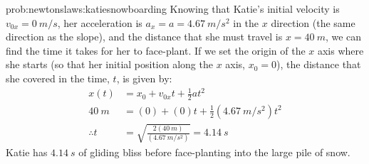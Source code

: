 \begin{solution}{prob:newtonslaws:katiesnowboarding}
Knowing that Katie's initial velocity is $v_{0x}=\SI{0}{m/s}$, her acceleration is $a_x=a=\SI{4.67}{m/s^2}$ in the $x$ direction (the same direction as the slope), and the distance that she must travel is $x=\SI{40}{m}$, we can find the time it takes for her to face-plant. If we set the origin of the $x$ axis where she starts (so that her initial position along the $x$ axis, $x_0=0$), the distance that she covered in the time, $t$, is given by:
\begin{align*}
x(t)&=x_0+v_{0x}t+\frac{1}{2}at^2\\
\SI{40}{m}&=(0)+(0)t+\frac{1}{2}(\SI{4.67}{m/s^2})t^2\\
\therefore t&=\sqrt{\frac{2(\SI{40}{m})}{(\SI{4.67}{m/s^2})}}=\SI{4.14}{s}
\end{align*}
Katie has $\SI{4.14}{s}$ of gliding bliss before face-planting into the large pile of snow.
\end{solution}


